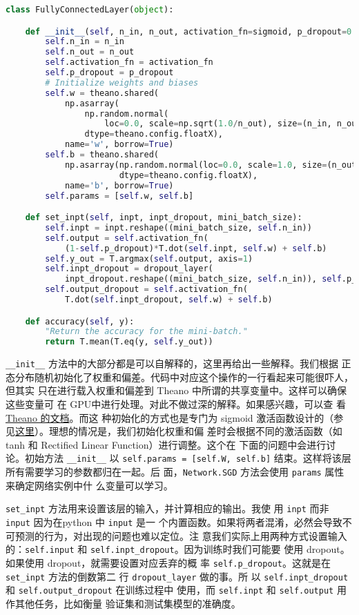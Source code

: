 \begin{lstlisting}[language=Python]
class FullyConnectedLayer(object):

    def __init__(self, n_in, n_out, activation_fn=sigmoid, p_dropout=0.0):
        self.n_in = n_in
        self.n_out = n_out
        self.activation_fn = activation_fn
        self.p_dropout = p_dropout
        # Initialize weights and biases
        self.w = theano.shared(
            np.asarray(
                np.random.normal(
                    loc=0.0, scale=np.sqrt(1.0/n_out), size=(n_in, n_out)),
                dtype=theano.config.floatX),
            name='w', borrow=True)
        self.b = theano.shared(
            np.asarray(np.random.normal(loc=0.0, scale=1.0, size=(n_out,)),
                       dtype=theano.config.floatX),
            name='b', borrow=True)
        self.params = [self.w, self.b]

    def set_inpt(self, inpt, inpt_dropout, mini_batch_size):
        self.inpt = inpt.reshape((mini_batch_size, self.n_in))
        self.output = self.activation_fn(
            (1-self.p_dropout)*T.dot(self.inpt, self.w) + self.b)
        self.y_out = T.argmax(self.output, axis=1)
        self.inpt_dropout = dropout_layer(
            inpt_dropout.reshape((mini_batch_size, self.n_in)), self.p_dropout)
        self.output_dropout = self.activation_fn(
            T.dot(self.inpt_dropout, self.w) + self.b)

    def accuracy(self, y):
        "Return the accuracy for the mini-batch."
        return T.mean(T.eq(y, self.y_out))
\end{lstlisting}

\lstinline!__init__! 方法中的大部分都是可以自解释的，这里再给出一些解释。我们根据
正态分布随机初始化了权重和偏差。代码中对应这个操作的一行看起来可能很吓人，但其实
只在进行载入权重和偏差到 Theano 中所谓的共享变量中。这样可以确保这些变量可
在 GPU中进行处理。对此不做过深的解释。如果感兴趣，可以查
看 \href{http://deeplearning.net/software/theano/index.html}{Theano 的文档}。而这
种初始化的方式也是专门为 sigmoid 激活函数设计的（参
见\hyperref[sec:weight_initialization]{这里}）。理想的情况是，我们初始化权重和偏
差时会根据不同的激活函数（如 tanh 和 Rectified Linear Function）进行调整。这个在
下面的问题中会进行讨论。初始方法 \lstinline!__init__! 以 
\lstinline!self.params = [self.W, self.b]! 结束。这样将该层所有需要学习的参数都归在一起。后
面，\lstinline!Network.SGD! 方法会使用 \lstinline!params! 属性来确定网络实例中什
么变量可以学习。

\lstinline!set_inpt! 方法用来设置该层的输入，并计算相应的输出。我使
用 \lstinline!inpt! 而非 \lstinline!input! 因为在python 中 \lstinline!input! 是一
个内置函数。如果将两者混淆，必然会导致不可预测的行为，对出现的问题也难以定位。注
意我们实际上用两种方式设置输入
的：\lstinline!self.input! 和 \lstinline!self.inpt_dropout!。因为训练时我们可能要
使用 dropout。如果使用 dropout，就需要设置对应丢弃的概
率 \lstinline!self.p_dropout!。这就是在 \lstinline!set_inpt! 方法的倒数第二
行 \lstinline!dropout_layer! 做的事。所
以 \lstinline!self.inpt_dropout! 和 \lstinline!self.output_dropout! 在训练过程中
使用，而 \lstinline!self.inpt! 和 \lstinline!self.output! 用作其他任务，比如衡量
验证集和测试集模型的准确度。

